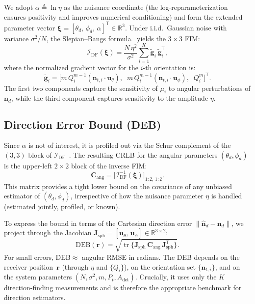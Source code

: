 \documentclass[journal]{IEEEtran}
\begin{document}
We adopt $\alpha\triangleq\ln\eta$ as the nuisance coordinate (the log-reparameterization ensures positivity and improves numerical conditioning) and form the extended parameter vector $\boldsymbol{\xi}=[\theta_d,\,\phi_d,\,\alpha]^{\mathsf T}\in\mathbb{R}^3$.  Under i.i.d.\ Gaussian noise with variance $\sigma^2/N$, the Slepian--Bangs formula~\cite{Kay1993} yields the $3\times3$ FIM:
\begin{equation}
\mathcal{I}_{\mathrm{DF}}(\boldsymbol\xi)
= \frac{N\,\eta^2}{\sigma^2}
  \sum_{i=1}^{K}
  \tilde{\mathbf g}_i\,\tilde{\mathbf g}_i^{\mathsf T},
\label{eq:FIM_DEB}
\end{equation}
where the normalized gradient vector for the $i$-th orientation is:
\begin{equation}
\tilde{\mathbf g}_i = \bigl[m\,Q_i^{m-1}(\mathbf{n}_{t,i}\!\cdot\!\mathbf{u}_\theta),\;\;m\,Q_i^{m-1}(\mathbf{n}_{t,i}\!\cdot\!\mathbf{u}_\phi),\;\;Q_i^m\bigr]^{\mathsf T}.
\label{eq:grad_xi}
\end{equation}
The first two components capture the sensitivity of $\mu_i$ to angular perturbations of $\mathbf{n}_d$, while the third component captures sensitivity to the amplitude $\eta$.

\subsection{Direction Error Bound (DEB)}
\label{subsec:DEB}

Since $\alpha$ is not of interest, it is profiled out via the Schur complement of the $(3,3)$ block of $\mathcal{I}_{\mathrm{DF}}$~\cite{Kay1993}.  The resulting CRLB for the angular parameters $(\theta_d,\phi_d)$ is the upper-left $2\times2$ block of the inverse FIM:
\begin{equation}
\mathbf{C}_{\mathrm{ang}} = \bigl[\mathcal{I}_{\mathrm{DF}}^{-1}(\boldsymbol\xi)\bigr]_{1:2,\,1:2}.
\label{eq:C_ang}
\end{equation}
This matrix provides a tight lower bound on the covariance of any unbiased estimator of $(\theta_d,\phi_d)$, irrespective of how the nuisance parameter $\eta$ is handled (estimated jointly, profiled, or known).

To express the bound in terms of the Cartesian direction error $\lVert\hat{\mathbf{n}}_d - \mathbf{n}_d\rVert$, we project through the Jacobian $\mathbf{J}_{\mathrm{sph}}=[\mathbf{u}_\theta,\,\mathbf{u}_\phi]\in\mathbb{R}^{3\times2}$:
\begin{equation}
\mathrm{DEB}(\mathbf{r})
= \sqrt{\operatorname{tr}\!\bigl\{\mathbf{J}_{\mathrm{sph}}\,\mathbf{C}_{\mathrm{ang}}\,\mathbf{J}_{\mathrm{sph}}^{\mathsf T}\bigr\}}.
\label{eq:DEB}
\end{equation}
For small errors, $\mathrm{DEB}\approx$ angular RMSE in radians.  The DEB depends on the receiver position~$\mathbf{r}$ (through $\eta$ and $\{Q_i\}$), on the orientation set $\{\mathbf{n}_{t,i}\}$, and on the system parameters $(N,\sigma^2,m,P_t,A_{\mathrm{det}})$.  Crucially, it uses only the $K$ direction-finding measurements and is therefore the appropriate benchmark for direction estimators.
\end{document}
